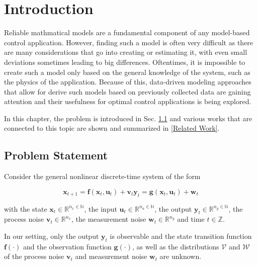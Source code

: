 \chapter{Introduction}
\label{sec:introduction}

Reliable mathmatical models are a fundamental component of any model-based control application. However, finding such a model is often very difficult as there are many considerations that go into creating or estimating it, with even small deviations sometimes leading to big differences. Oftentimes, it is impossible to create such a model only based on the general knowledge of the system, such as the physics of the application. Because of this, data-driven modeling approaches that allow for derive such models based on previously collected data are gaining attention and their usefulness for optimal control applications is being explored.


In this chapter, the problem is introduced in Sec. \ref{Problem Statement} and various works that are connected to this topic are shown and summarized in \ref{Related Work}.

\section{Problem Statement} \label{Problem Statement}

Consider the general nonlinear discrete-time system of the form

\begin{subequations} \label{System equation}
\begin{equation}
\boldsymbol{x}_{t+1} = \boldsymbol{f} \left( \boldsymbol{x}_{t}, \boldsymbol{u}_t \right) + \boldsymbol{v}_{t}
\end{equation}
\begin{equation}
\boldsymbol{y}_{t} = \boldsymbol{g} \left( \boldsymbol{x}_{t}, \boldsymbol{u}_t \right) + \boldsymbol{w}_{t}
\end{equation}
\end{subequations}

with the state $\boldsymbol{x}_t \in \mathbb{R}^{n_x \in \mathbb{N}}$, the input $\boldsymbol{u}_t \in \mathbb{R}^{n_u \in \mathbb{N}}$, the output $\boldsymbol{y}_t \in \mathbb{R}^{n_y \in \mathbb{N}}$, the process noise $\boldsymbol{v}_{t} \in \mathbb{R}^{n_x}$, the measurement noise $\boldsymbol{w}_{t} \in \mathbb{R}^{n_y}$ and time $t \in \mathbb{Z}$. 

In our setting, only the output $\boldsymbol{y}_t$ is observable and the state transition function $\boldsymbol{f}(\cdot)$ and the observation function $\boldsymbol{g}(\cdot)$, as well as the distributions $\boldsymbol{\mathcal{V}}$ and $\boldsymbol{\mathcal{W}}$ of the process noise $\boldsymbol{v}_t$ and measurement noise $\boldsymbol{w}_t$ are unknown.

